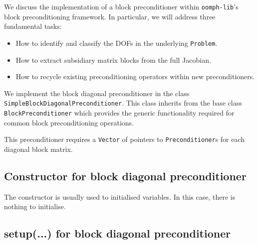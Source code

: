 We discuss the implementation of a block preconditioner within
\verb+oomph-lib+'s block preconditioning framework. In particular, we will address three fundamental tasks:
\begin{itemize}
\item How to identify and classify the DOFs in the underlying \verb+Problem+.
\item How to extract subsidiary matrix blocks from the full Jacobian.
\item How to recycle existing preconditioning operators within new preconditioners.
\end{itemize}

We implement the block diagonal preconditioner in the
class \verb+SimpleBlockDiagonalPreconditioner+. This class inherits
from the base class \verb+BlockPreconditioner+ which provides the generic 
functionality required for common block preconditioning operations.
\lstset{numberstyle=\scriptsize,breaklines=true, numbers=left, stepnumber=2, frame=single,basicstyle=\ttfamily\scriptsize, showstringspaces=false, language=C++}

This preconditioner requires a \verb+Vector+ of pointers to \verb+Preconditioner+s for each diagonal block matrix.


\subsection{Constructor for block diagonal preconditioner\label{sec:constructor_for_block_diagonal_preconditioner}}
The constructor is usually used to initialised variables. In this case, there is nothing to initialise.


\subsection{setup(...) for block diagonal preconditioner\label{sec:block_diagonal_preconditioner_setup}}

